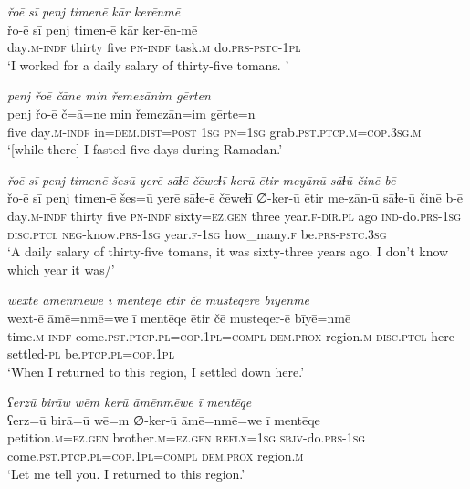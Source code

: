 \ea \label{ŽM.46}
\textit{řoē sī penj timenē kār kerēnmē} \\ 
\gll řo-ē sī penj timen-ē kār ker-ēn-mē \\ 
 day\textsc{.m}\textsc{-indf} thirty five \textsc{pn}\textsc{-indf} task\textsc{.m} do\textsc{.prs}\textsc{-pstc}\textsc{-\textsc{1pl}} \\ 
\glt `I worked for a daily salary of thirty-five tomans. '
\z 
 
\ea \label{ŽM.47}
\textit{penj řoē čāne min řemezānim gērten} \\ 
\gll penj řo-ē č=ā=ne min řemezān=im gērte=n \\ 
 five day\textsc{.m}\textsc{-indf} in=\textsc{dem.dist}\textsc{=\textsc{post}} \textsc{1sg} \textsc{pn}\textsc{=\textsc{1sg}} grab\textsc{.pst}\textsc{.ptcp}\textsc{.m}\textsc{=cop}\textsc{.3sg}\textsc{.m} \\ 
\glt `[while there] I fasted five days during Ramadan.'
\z 
 
\ea \label{ŽM.49}
\textit{řoē sī penj timenē šesū yerē sāɫē čēweɫī kerū ētir meyānū sāɫū činē bē} \\ 
\gll řo-ē sī penj timen-ē šes=ū yerē sāɫe-ē čēweɫī ∅-ker-ū ētir me-zān-ū sāɫe-ū činē b-ē \\ 
 day\textsc{.m}\textsc{-indf} thirty five \textsc{pn}\textsc{-indf} sixty\textsc{=ez.gen} three year\textsc{.f}\textsc{-dir}\textsc{.pl} ago \textsc{ind-}do\textsc{.prs}\textsc{-\textsc{1sg}} \textsc{disc}.\textsc{ptcl} \textsc{neg-}know\textsc{.prs}\textsc{-\textsc{1sg}} year\textsc{.f}\textsc{-\textsc{1sg}} how\_many\textsc{.f} be\textsc{.prs}\textsc{-pstc}\textsc{.3sg} \\ 
\glt `A daily salary of thirty-five tomans, it was sixty-three years ago. I don’t know which year it was/'
\z 
 
\ea \label{ŽM.51}
\textit{wextē āmēnmēwe ī mentēqe ētir čē musteqerē bīyēnmē} \\ 
\gll wext-ē āmē=nmē=we ī mentēqe ētir čē musteqer-ē bīyē=nmē \\ 
 time\textsc{.m}\textsc{-indf} come\textsc{.pst}\textsc{.ptcp}\textsc{.pl}\textsc{=cop}\textsc{.\textsc{1pl}}\textsc{=compl} \textsc{dem.prox} region\textsc{.m} \textsc{disc}.\textsc{ptcl} here settled\textsc{\textsc{-pl}} be\textsc{.ptcp}\textsc{.pl}\textsc{=cop}\textsc{.\textsc{1pl}} \\ 
\glt `When I returned to this region, I settled down here.'
\z 
 
\ea \label{ŽM.53}
\textit{ʕerzū birāw wēm kerū āmēnmēwe ī mentēqe} \\ 
\gll ʕerz=ū birā=ū wē=m ∅-ker-ū āmē=nmē=we ī mentēqe \\ 
 petition\textsc{.m}\textsc{=ez.gen} brother\textsc{.m}\textsc{=ez.gen} \textsc{reflx}\textsc{=\textsc{1sg}} \textsc{sbjv-}do\textsc{.prs}\textsc{-\textsc{1sg}} come\textsc{.pst}\textsc{.ptcp}\textsc{.pl}\textsc{=cop}\textsc{.\textsc{1pl}}\textsc{=compl} \textsc{dem.prox} region\textsc{.m} \\ 
\glt `Let me tell you. I returned to this region.'
\z 
 
